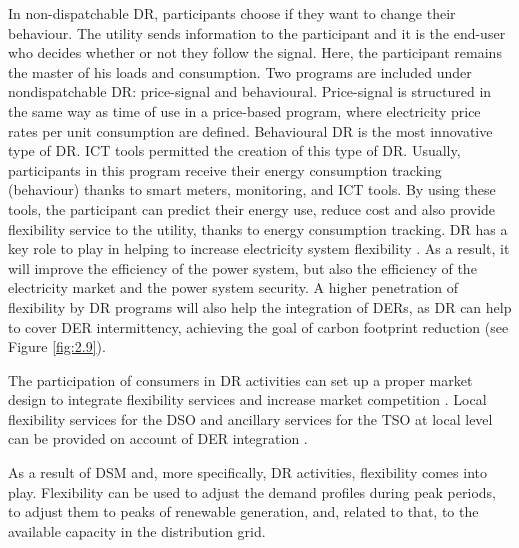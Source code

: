 In non-dispatchable DR, participants choose if they want to change their behaviour. The utility sends information to the participant and it is the end-user who decides whether or not they follow the signal. Here, the participant remains the master of his loads and consumption. Two programs are included under nondispatchable DR: price-signal and behavioural. Price-signal is structured in the same way as time of use in a price-based program, where electricity price rates per unit consumption are defined. Behavioural DR is the
most innovative type of DR. ICT tools permitted the creation of this type of DR. Usually, participants in this program receive their energy consumption tracking (behaviour) thanks to smart meters, monitoring, and ICT tools. By using these tools, the participant can predict their energy use, reduce cost and also provide flexibility service to the utility, thanks to energy consumption tracking.
DR has a key role to play in helping to increase electricity system flexibility \cite{Cooke2011}. As a result, it will improve the efficiency of the power system, but also the efficiency of the electricity market and the power system security. A higher penetration of flexibility by DR programs will also help the integration of DERs, as DR can help to cover DER intermittency, achieving the goal of carbon footprint reduction (see Figure \ref{fig:2.9}).

The participation of consumers in DR activities can set up a proper market design to integrate flexibility services and increase market competition \cite{MarketDesignENTSOE}. Local flexibility services for the DSO and ancillary services for the TSO at local level can be provided on account of DER integration \cite{Roques2017}.

As a result of DSM and, more specifically, DR activities, flexibility comes into play. Flexibility can be used to adjust the demand profiles during peak periods, to adjust them to peaks of renewable generation, and, related to that, to the available capacity in the distribution grid.

